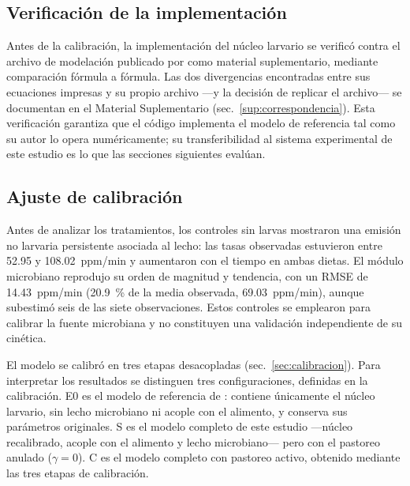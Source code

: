 
\subsection{Verificación de la implementación}
\label{sec:verificacion}

Antes de la calibración, la implementación del núcleo larvario se verificó contra el archivo de modelación publicado por \textcite{eriksenDynamicModellingFeed2022} como material suplementario, mediante comparación fórmula a fórmula. Las dos divergencias encontradas entre sus ecuaciones impresas y su propio archivo ---y la decisión de replicar el archivo--- se documentan en el Material Suplementario (sec.~\ref{sup:correspondencia}). Esta verificación garantiza que el código implementa el modelo de referencia tal como su autor lo opera numéricamente; su transferibilidad al sistema experimental de este estudio es lo que las secciones siguientes evalúan.

\subsection{Ajuste de calibración}
\label{sec:ajuste}

Antes de analizar los tratamientos, los controles sin larvas mostraron una emisión no larvaria persistente asociada al lecho: las tasas observadas estuvieron entre 52.95 y 108.02~ppm/min y aumentaron con el tiempo en ambas dietas. El módulo microbiano reprodujo su orden de magnitud y tendencia, con un RMSE de 14.43~ppm/min (20.9~\% de la media observada, 69.03~ppm/min), aunque subestimó seis de las siete observaciones. Estos controles se emplearon para calibrar la fuente microbiana y no constituyen una validación independiente de su cinética.

El modelo se calibró en tres etapas desacopladas (sec.~\ref{sec:calibracion}). Para interpretar los resultados se distinguen tres configuraciones, definidas en la calibración. E0 es el modelo de referencia de \textcite{eriksenDynamicModellingFeed2022}: contiene únicamente el núcleo larvario, sin lecho microbiano ni acople con el alimento, y conserva sus parámetros originales. S es el modelo completo de este estudio ---núcleo recalibrado, acople con el alimento y lecho microbiano--- pero con el pastoreo anulado ($\gamma = 0$). C es el modelo completo con pastoreo activo, obtenido mediante las tres etapas de calibración. 

